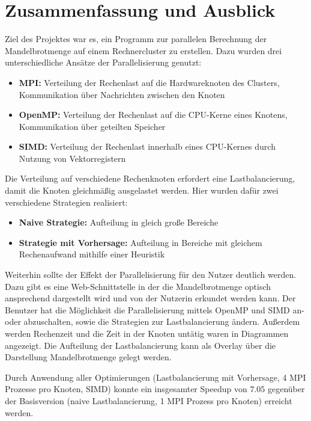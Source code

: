 \section{Zusammenfassung und Ausblick}


Ziel des Projektes war es, ein Programm zur parallelen Berechnung der Mandelbrotmenge auf einem Rechnercluster zu erstellen.
Dazu wurden drei unterschiedliche Ansätze der Parallelisierung genutzt:
\begin{itemize}
	\item \textbf{MPI:} Verteilung der Rechenlast auf die Hardwareknoten des Clusters, Kommunikation über Nachrichten zwischen den Knoten
	\item \textbf{OpenMP:} Verteilung der Rechenlast auf die CPU-Kerne eines Knotens, Kommunikation über geteilten Speicher
	\item \textbf{SIMD:} Verteilung der Rechenlast innerhalb eines CPU-Kernes durch Nutzung von Vektorregistern
\end{itemize}

Die Verteilung auf verschiedene Rechenknoten erfordert eine Lastbalancierung, damit die Knoten gleichmäßig ausgelastet werden.
Hier wurden dafür zwei verschiedene Strategien realisiert:
\begin{itemize}
	\item \textbf{Naive Strategie:} Aufteilung in gleich große Bereiche
	\item \textbf{Strategie mit Vorhersage:} Aufteilung in Bereiche mit gleichem Rechenaufwand mithilfe einer Heuristik
\end{itemize}

Weiterhin sollte der Effekt der Parallelisierung für den Nutzer deutlich werden.
Dazu gibt es eine Web-Schnittstelle in der die Mandelbrotmenge optisch ansprechend dargestellt wird und von der Nutzerin erkundet werden kann.
Der Benutzer hat die Möglichkeit die Parallelisierung mittels OpenMP und SIMD an- oder abzuschalten, sowie die Strategien zur Lastbalancierung ändern.
Außerdem werden Rechenzeit und die Zeit in der Knoten untätig waren in Diagrammen angezeigt.
Die Aufteilung der Lastbalancierung kann als Overlay über die Darstellung Mandelbrotmenge gelegt werden.

Durch Anwendung aller Optimierungen (Lastbalancierung mit Vorhersage, 4 MPI Prozesse pro Knoten, SIMD) konnte ein insgesamter Speedup von $7.05$ gegenüber der Basisversion (naive Lastbalancierung, 1 MPI Prozess pro Knoten) erreicht werden.

